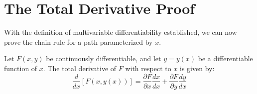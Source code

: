 \documentclass{essay}
\begin{document}
\section{The Total Derivative Proof}

With the definition of multivariable differentiability established, we can now prove the chain rule for a path parameterized by $x$.

\begin{theorem}
Let $F(x,y)$ be continuously differentiable, and let $y = y(x)$ be a differentiable function of $x$. The total derivative of $F$ with respect to $x$ is given by:
\[ \frac{d}{dx}[F(x, y(x))] = \frac{\partial F}{\partial x} \frac{dx}{dx} + \frac{\partial F}{\partial y} \frac{dy}{dx} \]
\end{theorem}
\end{document}
